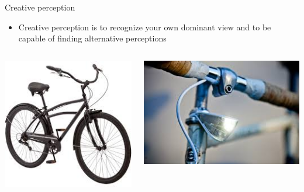 \documentclass[notes]{beamer}
\begin{document}
\begin{frame}{Creative perception}
	\begin{itemize}
		\item \textcolor{HoGentAccent1}{Creative perception} is to recognize your own \textcolor{HoGentAccent1}{dominant} view and to be capable of finding alternative perceptions
	\end{itemize}
\pause
\begin{columns}
	\begin{column}{0.5\textwidth}
		\includegraphics[width = 0.9 \textwidth]{img/bike.jpeg}
	\end{column}
	\begin{column}{0.5\textwidth}
	\includegraphics[width = \textwidth]{img/light.jpeg}
\end{column}
\end{columns}
\end{frame}
\end{document}
